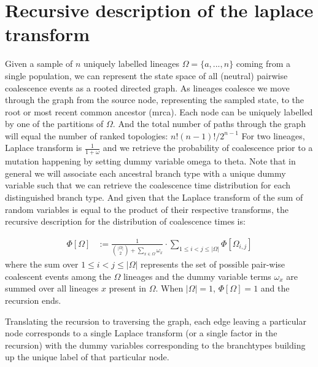 \documentclass[10pt, a4]{article}
\begin{document}
\section{Recursive description of the laplace transform}
Given a sample of $n$ uniquely labelled lineages $\Omega = \{a, ..., n\}$ coming from a single population, we can represent the state space of all (neutral) pairwise coalescence events as a rooted directed graph. As lineages coalesce we move through the graph from the source node, representing the sampled state, to the root or most recent common ancestor (mrca). Each node can be uniquely labelled by one of the partitions of $\Omega$. And the total number of paths through the graph will equal the number of ranked topologies: $n!(n-1)!/2^{n-1}$ \citep{Lohse2016} %
For two lineages, Laplace transform is $\frac{1}{1+\omega}$ and we retrieve the probability of coalescence prior to a mutation happening by setting dummy variable omega to theta. Note that in general we will associate each ancestral branch type with a unique dummy variable such that we can retrieve the coalescence time distribution for each distinguished branch type. And given that the Laplace transform of the sum of random variables is equal to the product of their respective transforms, the recursive description for the distribution of coalescence times is:

 \begin{equation}\label{eq:recursion_neutral} 
 \begin{split}
         \Phi[\Omega] &:= \frac{1}{\binom{|\Omega|}{2}+ \sum\limits_{x \in \Omega}\omega_x} \cdot \sum\limits_{1 \leq i < j \leq |\Omega|} \Phi[\Omega_{i,j}]
 \end{split}
 \end{equation}
where the sum over $1 \leq i < j \leq |\Omega|$ represents the set of possible pair-wise coalescent events among the $\Omega$ lineages and the dummy variable terms $\omega_x$ are summed over all lineages $x$ present in $\Omega$. When $|\Omega|=1$, $\Phi[\Omega] = 1$ and the recursion ends.

Translating the recursion to traversing the graph, each edge leaving a particular node corresponds to a single Laplace transform (or a single factor in the recursion) with the dummy variables corresponding to the branchtypes building up the unique label of that particular node.
\end{document}
